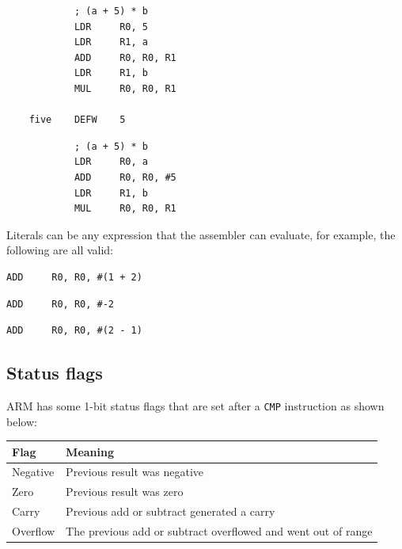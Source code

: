 \documentclass{article}
\begin{document}
\begin{minipage}[t]{0.5\textwidth}
	\begin{verbatim}
			; (a + 5) * b
			LDR 	R0, 5
			LDR 	R1, a
			ADD 	R0, R0, R1
			LDR 	R1, b
			MUL 	R0, R0, R1

	five	DEFW	5
	\end{verbatim}
\end{minipage}
\begin{minipage}[t]{0.5\textwidth}
	\begin{verbatim}
			; (a + 5) * b
			LDR 	R0, a
			ADD 	R0, R0, #5
			LDR 	R1, b
			MUL 	R0, R0, R1
	\end{verbatim}
\end{minipage}

Literals can be any expression that the assembler can evaluate, for example, the following are all valid:

\begin{verbatim}
ADD 	R0, R0, #(1 + 2)
\end{verbatim}

\begin{verbatim}
ADD 	R0, R0, #-2
\end{verbatim}

\begin{verbatim}
ADD 	R0, R0, #(2 - 1)
\end{verbatim}

\subsection{Status flags}

ARM has some 1-bit status flags that are set after a {\tt CMP} instruction as shown below:

\begin{tabular}{l|l}
	Flag & Meaning\\ \hline
	Negative & Previous result was negative\\ \hline
	Zero & Previous result was zero\\ \hline
	Carry & Previous add or subtract generated a carry\\ \hline
	Overflow & The previous add or subtract overflowed and went out of range\\ \hline
\end{tabular}
\end{document}
